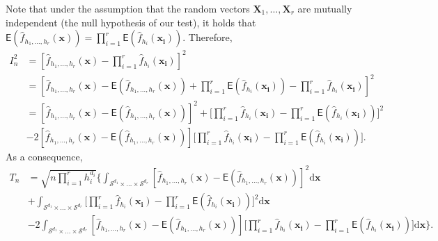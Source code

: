 \documentclass{article}
\begin{document}
Note that under the assumption that the random vectors $\mathbf{X}_1, \dots, \mathbf{X}_r$ are mutually independent (the null hypothesis of our test), it holds that $\mathsf{E} (\hat{f}_{h_1, \dots, h_r}(\mathbf{x})) = \prod_{i = 1}^{r} \mathsf{E} (\hat{f}_{h_i}(\mathbf{x_i}))$. Therefore,
\begin{align}
    I_n^2 &= [\hat{f}_{h_1, \dots, h_r}(\mathbf{x}) - \prod_{i = 1}^{r} \hat{f}_{h_i}(\mathbf{x_i})]^2 \\
    &= [\hat{f}_{h_1, \dots, h_r}(\mathbf{x}) - \mathsf{E} (\hat{f}_{h_1, \dots, h_r}(\mathbf{x})) + \prod_{i = 1}^{r} \mathsf{E} (\hat{f}_{h_i}(\mathbf{x_i})) - \prod_{i = 1}^{r} \hat{f}_{h_i}(\mathbf{x_i})]^2 \\
    &= [\hat{f}_{h_1, \dots, h_r}(\mathbf{x}) - \mathsf{E} (\hat{f}_{h_1, \dots, h_r}(\mathbf{x}))]^2 + \Big[ \prod_{i = 1}^{r} \hat{f}_{h_i}(\mathbf{x_i}) - \prod_{i = 1}^{r} \mathsf{E} (\hat{f}_{h_i} (\mathbf{x_i})) \Big]^2 \\
    &- 2[\hat{f}_{h_1, \dots, h_r}(\mathbf{x}) - \mathsf{E} (\hat{f}_{h_1, \dots, h_r}(\mathbf{x}))] \Big[ \prod_{i = 1}^{r} \hat{f}_{h_i}(\mathbf{x_i}) - \prod_{i = 1}^{r} \mathsf{E} (\hat{f}_{h_i} (\mathbf{x_i})) \Big].
\end{align}
As a consequence,
\begin{align}
    T_n &= \sqrt{n \prod_{i = 1}^{r} h_i^{d_i}} \Bigg\{ \int_{\mathcal{S}^{d_1} \times \dots \times \mathcal{S}^{d_r}} [\hat{f}_{h_1, \dots, h_r}(\mathbf{x}) - \mathsf{E} (\hat{f}_{h_1, \dots, h_r}(\mathbf{x}))]^2 \mathrm{d} \mathbf{x} \\
    &+ \int_{\mathcal{S}^{d_1} \times \dots \times \mathcal{S}^{d_r}} \Big[ \prod_{i = 1}^{r} \hat{f}_{h_i}(\mathbf{x_i}) - \prod_{i = 1}^{r} \mathsf{E} (\hat{f}_{h_i} (\mathbf{x_i})) \Big]^2 \mathrm{d} \mathbf{x} \\
    &-2 \int_{\mathcal{S}^{d_1} \times \dots \times \mathcal{S}^{d_r}} [\hat{f}_{h_1, \dots, h_r}(\mathbf{x}) - \mathsf{E} (\hat{f}_{h_1, \dots, h_r}(\mathbf{x}))] \Big[ \prod_{i = 1}^{r} \hat{f}_{h_i}(\mathbf{x_i}) - \prod_{i = 1}^{r} \mathsf{E} (\hat{f}_{h_i} (\mathbf{x_i})) \Big] \mathrm{d} \mathbf{x} \Bigg\}.
\end{align}



\end{document}
